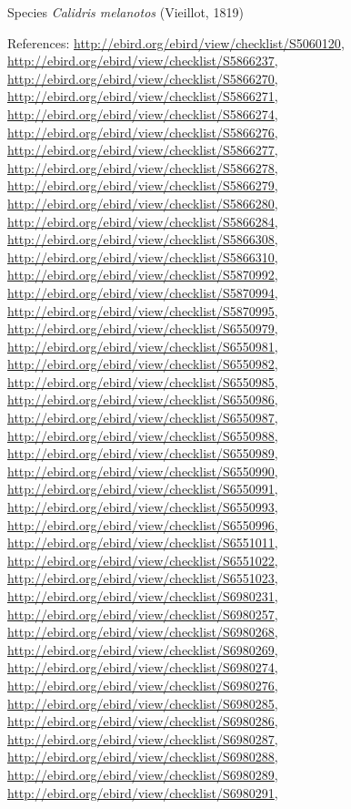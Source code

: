 \documentclass[9pt, article]{memoir}
\begin{document}
\begin{multicols}{2}
\vspace{6pt}\noindent\hspace{36pt}Species \textit{Calidris melanotos} (Vieillot, 1819)


\vspace{6pt}References: 
\url{http://ebird.org/ebird/view/checklist/S5060120}, 
\url{http://ebird.org/ebird/view/checklist/S5866237}, 
\url{http://ebird.org/ebird/view/checklist/S5866270}, 
\url{http://ebird.org/ebird/view/checklist/S5866271}, 
\url{http://ebird.org/ebird/view/checklist/S5866274}, 
\url{http://ebird.org/ebird/view/checklist/S5866276}, 
\url{http://ebird.org/ebird/view/checklist/S5866277}, 
\url{http://ebird.org/ebird/view/checklist/S5866278}, 
\url{http://ebird.org/ebird/view/checklist/S5866279}, 
\url{http://ebird.org/ebird/view/checklist/S5866280}, 
\url{http://ebird.org/ebird/view/checklist/S5866284}, 
\url{http://ebird.org/ebird/view/checklist/S5866308}, 
\url{http://ebird.org/ebird/view/checklist/S5866310}, 
\url{http://ebird.org/ebird/view/checklist/S5870992}, 
\url{http://ebird.org/ebird/view/checklist/S5870994}, 
\url{http://ebird.org/ebird/view/checklist/S5870995}, 
\url{http://ebird.org/ebird/view/checklist/S6550979}, 
\url{http://ebird.org/ebird/view/checklist/S6550981}, 
\url{http://ebird.org/ebird/view/checklist/S6550982}, 
\url{http://ebird.org/ebird/view/checklist/S6550985}, 
\url{http://ebird.org/ebird/view/checklist/S6550986}, 
\url{http://ebird.org/ebird/view/checklist/S6550987}, 
\url{http://ebird.org/ebird/view/checklist/S6550988}, 
\url{http://ebird.org/ebird/view/checklist/S6550989}, 
\url{http://ebird.org/ebird/view/checklist/S6550990}, 
\url{http://ebird.org/ebird/view/checklist/S6550991}, 
\url{http://ebird.org/ebird/view/checklist/S6550993}, 
\url{http://ebird.org/ebird/view/checklist/S6550996}, 
\url{http://ebird.org/ebird/view/checklist/S6551011}, 
\url{http://ebird.org/ebird/view/checklist/S6551022}, 
\url{http://ebird.org/ebird/view/checklist/S6551023}, 
\url{http://ebird.org/ebird/view/checklist/S6980231}, 
\url{http://ebird.org/ebird/view/checklist/S6980257}, 
\url{http://ebird.org/ebird/view/checklist/S6980268}, 
\url{http://ebird.org/ebird/view/checklist/S6980269}, 
\url{http://ebird.org/ebird/view/checklist/S6980274}, 
\url{http://ebird.org/ebird/view/checklist/S6980276}, 
\url{http://ebird.org/ebird/view/checklist/S6980285}, 
\url{http://ebird.org/ebird/view/checklist/S6980286}, 
\url{http://ebird.org/ebird/view/checklist/S6980287}, 
\url{http://ebird.org/ebird/view/checklist/S6980288}, 
\url{http://ebird.org/ebird/view/checklist/S6980289}, 
\url{http://ebird.org/ebird/view/checklist/S6980291}, 

\end{multicols}
\end{document}
